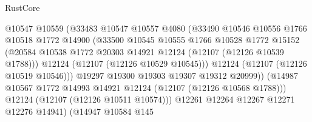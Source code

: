 \begin{lexlean}{RustCore}
\begin{coremodule}
                                    @10547
                                    @10559
                                    (@33483
                                      @10547
                                      @10557
                                      @4080
                                      (@33490
                                        @10546
                                        @10556
                                        @1766
                                        @10518
                                        @1772
                                        @14900
                                        (@33500
                                          @10545
                                          @10555
                                          @1766
                                          @10528
                                          @1772
                                          @15152
                                          (@20584
                                            @10538
                                            @1772
                                            @20303
                                            @14921
                                            @12124
                                            (@12107 (@12126 @10539 @1788)))
                                          @12124
                                          (@12107 (@12126 @10529 @10545)))
                                        @12124
                                        (@12107 (@12126 @10519 @10546)))
                                      @19297
                                      @19300
                                      @19303
                                      @19307
                                      @19312
                                      @20999))
                                  (@14987
                                    @10567
                                    @1772
                                    @14993
                                    @14921
                                    @12124
                                    (@12107 (@12126 @10568 @1788)))
                                  @12124
                                  (@12107 (@12126 @10511 @10574)))
                                @12261
                                @12264
                                @12267
                                @12271
                                @12276
                                @14941)
                              (@14947
                                @10584
                                @145

\end{coremodule}
\end{lexlean}
